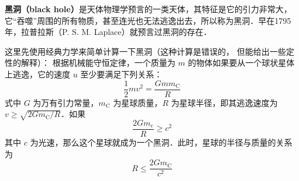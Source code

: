

\textbf{黑洞（black hole）}是天体物理学预言的一类天体，其特征是它的引力非常大，它“吞噬”周围的所有物质，甚至连光也无法逃逸出去，所以称为黑洞．早在1795 年，拉普拉斯（P. S. M. Laplace）就预言过黑洞的存在．

这里先使用经典力学来简单计算一下黑洞（这种计算是错误的， 但能给出一些定性的解释）： 根据机械能守恒定律，一个质量为 $m$ 的物体如果要从一个球状星体上逃逸，它的速度 $u $ 至少要满足下列关系：
\begin{equation}
\frac{1}{2} m v^{2}=\frac{G m m_{\mathrm{C}}}{R}
\end{equation}
式中 $G $ 为万有引力常量，$ m_{\mathrm{C}}$ 为星球质量，$ R $ 为星球半径，即其逃逸速度为 $v \geqslant \sqrt{2 G m_{\mathrm{C}}/R}$．如果
\begin{equation}
\frac{2 G m_{\mathrm{c}}}{R} \geqslant c^{2}
\end{equation}
其中 $c$ 为光速，那么这个星球就成为一个黑洞．此时，星球的半径与质量的关系为
\begin{equation}
R \leqslant \frac{2 G m_{\mathrm{C}}}{c^{2}}
\end{equation}